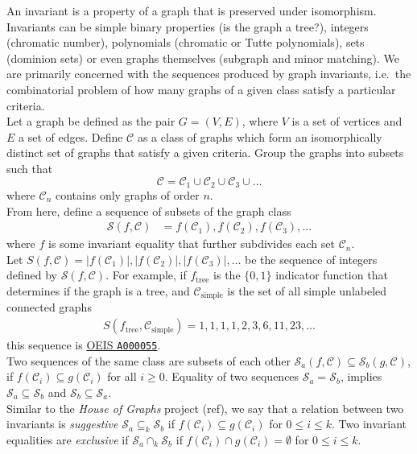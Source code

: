 \documentclass[12pt]{article}
\newcommand{\OEIS}[1]
{\href{https://oeis.org/#1}{OEIS \texttt{#1}}}
\newcommand{\SEQ}{\mathcal{S}}
\newcommand{\CLASS}{\mathcal{C}}
\newcommand{\SIMPLECLASS}{\mathcal{C}_\text{simple}}
\newcommand{\ie}[0]{i.e.\ }
\begin{document}
An invariant is a property of a graph that is preserved under isomorphism. Invariants can be simple binary properties (is the graph a tree?), integers (chromatic number), polynomials (chromatic or Tutte polynomials), sets (dominion sets) or even graphs themselves (subgraph and minor matching). We are primarily concerned with the sequences produced by graph invariants, \ie the combinatorial problem of how many graphs of a given class satisfy a particular criteria. \\

Let a graph be defined as the pair $G = (V,E)$, where $V$ is a set of vertices and $E$ a set of edges. Define $\CLASS$ as a class of graphs which form an isomorphically distinct set of graphs that satisfy a given criteria. Group the graphs into subsets such that
\begin{equation}
\CLASS = \CLASS_1 \cup \CLASS_2 \cup \CLASS_3 \cup \ldots
\end{equation}
where $\CLASS_n$ contains only graphs of order $n$. \\

From here, define a sequence of subsets of the graph class
%
\begin{align}
\SEQ(f, \CLASS) 
&= f(\CLASS_1), f(\CLASS_2), f(\CLASS_3), \ldots 
\end{align}
%
where $f$ is some invariant equality that further subdivides each set $\CLASS_n$. \\

Let 
$S(f, \CLASS) = |f(\CLASS_1)|, |f(\CLASS_2)|, |f(\CLASS_3)|, \ldots$
be the sequence of integers defined by $\SEQ(f, \CLASS)$. For example, if $f_\text{tree}$ is the $\{0,1\}$ indicator function that determines if the graph is a tree, and $\SIMPLECLASS$ is the set of all simple unlabeled connected graphs
%
\begin{align}
S(f_\text{tree}, \SIMPLECLASS) = 1, 1, 1, 1, 2, 3, 6, 11, 23, \ldots
\end{align}
%
this sequence is \OEIS{A000055}. \\

Two sequences of the same class are subsets of each other $\SEQ_a(f,\CLASS) \subseteq \SEQ_b(g, \CLASS)$, if $f(\CLASS_i) \subseteq g(\CLASS_i)$ for all $i\ge0$. Equality of two sequences $\SEQ_a = \SEQ_b$, implies $\SEQ_a \subseteq \SEQ_b$ and $\SEQ_b \subseteq \SEQ_a$.  \\

Similar to the \textit{House of Graphs} project (ref), we say that a relation between two invariants is \textit{suggestive} $\SEQ_a \subseteq_k \SEQ_b$ if $f(\CLASS_i) \subseteq g(\CLASS_i)$ for $0 \le i \le k$. Two invariant equalities are \textit{exclusive} if $\SEQ_a \cap_k \SEQ_b$ if $f(\CLASS_i) \cap g(\CLASS_i) = \emptyset$ for $0 \le i \le k$. \\
\end{document}
